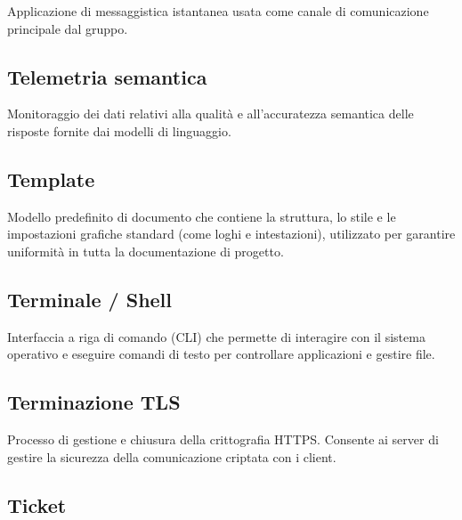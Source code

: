 \documentclass[a4paper, 11pt, oneside]{scrartcl} %
\begin{document}

Applicazione di messaggistica istantanea usata come canale di comunicazione principale dal gruppo.

\vspace{0.5cm}

\subsection*{Telemetria semantica}
Monitoraggio dei dati relativi alla qualità e all'accuratezza semantica delle risposte fornite dai modelli di linguaggio.
\vspace{0.5cm}

\subsection*{Template}
Modello predefinito di documento che contiene la struttura, lo stile e le impostazioni grafiche standard (come loghi e intestazioni), utilizzato per garantire uniformità in tutta la documentazione di progetto.
\vspace{0.5cm}

\subsection*{Terminale / Shell}


Interfaccia a riga di comando (CLI) che permette di interagire con il sistema operativo e eseguire comandi di testo per controllare applicazioni e gestire file.

\vspace{0.5cm}

\subsection*{Terminazione TLS}


Processo di gestione e chiusura della crittografia HTTPS. Consente ai server di gestire la sicurezza della comunicazione criptata con i client.

\vspace{0.5cm}

\subsection*{Ticket}
\end{document}
